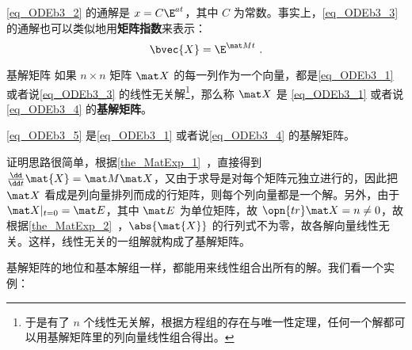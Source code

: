 \autoref{eq_ODEb3_2} 的通解是 $x=C\E^{at}$，其中 $C$ 为常数。事实上，\autoref{eq_ODEb3_3} 的通解也可以类似地用\textbf{矩阵指数}来表示：
\begin{equation}\label{eq_ODEb3_5}
\bvec{X}=\E^{\mat Mt}~.
\end{equation}

\begin{definition}{基解矩阵}
如果 $n\times n$ 矩阵 $\mat X$ 的每一列作为一个向量，都是\autoref{eq_ODEb3_1} 或者说\autoref{eq_ODEb3_3} 的线性无关解\footnote{于是有了 $n$ 个线性无关解，根据方程组的存在与唯一性定理，任何一个解都可以用基解矩阵里的列向量线性组合得出。}，那么称 $\mat X$ 是 \autoref{eq_ODEb3_1} 或者说\autoref{eq_ODEb3_4} 的\textbf{基解矩阵}。
\end{definition}

\begin{theorem}{}
\autoref{eq_ODEb3_5} 是\autoref{eq_ODEb3_1} 或者说\autoref{eq_ODEb3_4} 的基解矩阵。
\end{theorem}

证明思路很简单，根据\autoref{the_MatExp_1}~，直接得到 $\frac{\dd}{\dd t}\mat{X}=\mat M\mat X$，又由于求导是对每个矩阵元独立进行的，因此把 $\mat X$ 看成是列向量排列而成的行矩阵，则每个列向量都是一个解。另外，由于 $\mat X|_{t=0}=\mat E$，其中 $\mat E$ 为单位矩阵，故 $\opn{tr}\mat X=n\not=0$，故根据\autoref{the_MatExp_2}~，$\abs{\mat{X}}$ 的行列式不为零，故各解向量线性无关。这样，线性无关的一组解就构成了基解矩阵。


基解矩阵的地位和基本解组一样，都能用来线性组合出所有的解。我们看一个实例：

